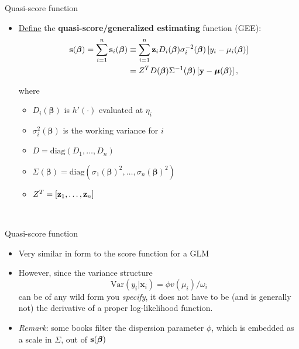 \documentclass{beamer}
\newcommand{\boldbeta}{{\boldsymbol \beta}}
\newenvironment{wideitemize}%
  {\begin{itemize}%
    \setlength{\parskip}{1em}}%
  {\end{itemize}}
\begin{document}
\begin{frame} {Quasi-score function}

\begin{wideitemize}

\item \underline{Define} the {\bf quasi-score/generalized estimating }function (GEE):
\begin{align*}
\textbf{s}(\mbox{\boldmath $\beta$})= \sum_{i = 1}^n  {\bf s}_i({\boldsymbol \beta})  &\equiv \sum_{i=1}^n\textbf{z}_i D_i(\mbox{\boldmath $\beta$})
\sigma_i^{-2}(\mbox{\boldmath $\beta$})\left[y_i-\mu_i(\mbox{\boldmath $\beta$})\right] \\
&=Z^TD(\mbox{\boldmath $\beta$})\Sigma^{-1}(\mbox{\boldmath $\beta$})\left[\textbf{y}-
\mbox{\boldmath $\mu$}(\mbox{\boldmath $\beta$})\right],
\end{align*}

where 

\begin{wideitemize}
\item $D_i({\boldsymbol \beta})$ is  $h'(\cdot)$ evaluated at $\eta_i$
\item  $\sigma^2_i({\boldsymbol \beta})$ is the working variance for $i$
\item $D = \text{diag}(D_1, \dots, D_n)$
\item $\Sigma (\boldbeta) = \text{diag}(\sigma_1(\boldbeta)^2, \dots, \sigma_n(\boldbeta)^2)$
\item $Z^T = [{\bf z}_1, \dots, {\bf z}_n]$
\end{wideitemize}


\ \


\end{wideitemize}


\end{frame} 
\begin{frame}{Quasi-score function}
\begin{wideitemize}
\item Very similar in form to the score function for a GLM 

\item However,  since the variance structure 
\[
\mbox{Var}(y_i|\textbf{x}_i)   =\phi v(\mu_i)/\omega_i
\]
can be of any wild form you \emph{specify}, it does not have  to be (and is generally not) the derivative of a proper log-likelihood function.  



\item \emph{Remark}:  some books filter the dispersion parameter $\phi$, which is embedded as a scale in $\Sigma$,  out of ${\bf s} ({\boldsymbol \beta})$

\end{wideitemize}

\end{frame}
\end{document}
